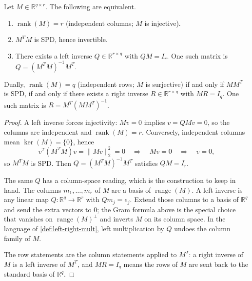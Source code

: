 \documentclass[11pt,a4paper]{article}
\DeclareMathOperator{\rank}{rank}
\begin{document}
\begin{lemma}
\label{lem:one-sided-inverse}
Let \(M\in\mathbb{R}^{q\times r}\). The following are equivalent.
\begin{enumerate}[label=\textup{(\roman*)}]
    \item
    \(\rank(M)=r\) (independent columns; \(M\) is injective).
    \item
    \(M^{T}M\) is SPD, hence invertible.
    \item
    There exists a left inverse \(Q\in\mathbb{R}^{r\times q}\) with \(QM=I_{r}\). One such matrix is \(Q=(M^{T}M)^{-1}M^{T}\).
\end{enumerate}
Dually, \(\rank(M)=q\) (independent rows; \(M\) is surjective) if and only if \(MM^{T}\) is SPD, if and only if there exists a right inverse \(R\in\mathbb{R}^{r\times q}\) with \(MR=I_{q}\). One such matrix is \(R=M^{T}(MM^{T})^{-1}\).
\end{lemma}

\begin{proof}
A left inverse forces injectivity: \(Mv=0\) implies \(v=QMv=0\), so the columns are independent and \(\rank(M)=r\). Conversely, independent columns mean \(\ker(M)=\{0\}\), hence
\[
v^{T}(M^{T}M)v
=
\|Mv\|_{2}^{2}
=
0
\quad\Longrightarrow\quad
Mv=0
\quad\Longrightarrow\quad
v=0,
\]
so \(M^{T}M\) is SPD. Then \(Q=(M^{T}M)^{-1}M^{T}\) satisfies \(QM=I_{r}\).

The same \(Q\) has a column-space reading, which is the construction to keep in hand. The columns \(m_{1},\ldots,m_{r}\) of \(M\) are a basis of \(\operatorname{range}(M)\). A left inverse is any linear map \(Q:\mathbb{R}^{q}\to\mathbb{R}^{r}\) with \(Q m_{j}=e_{j}\). Extend those columns to a basis of \(\mathbb{R}^{q}\) and send the extra vectors to \(0\); the Gram formula above is the special choice that vanishes on \(\operatorname{range}(M)^{\perp}\) and inverts \(M\) on its column space. In the language of \cref{def:left-right-mult}, left multiplication by \(Q\) undoes the column family of \(M\).

The row statements are the column statements applied to \(M^{T}\): a right inverse of \(M\) is a left inverse of \(M^{T}\), and \(MR=I_{q}\) means the rows of \(M\) are sent back to the standard basis of \(\mathbb{R}^{q}\).
\end{proof}
\end{document}
